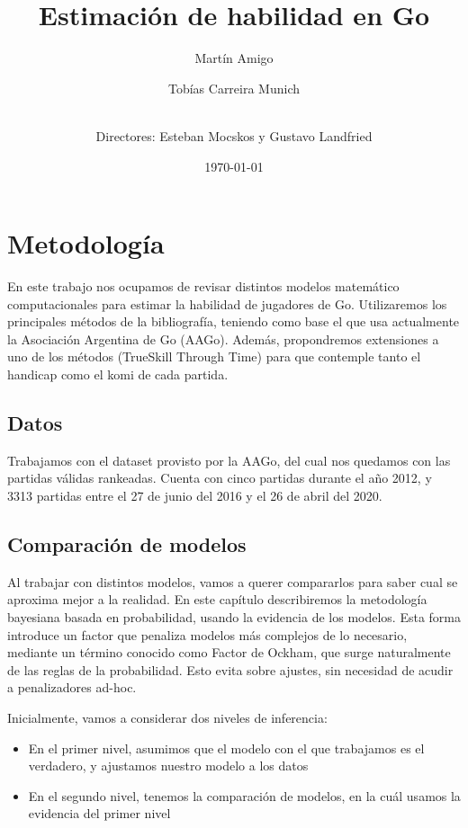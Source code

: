 \documentclass[a4paper,10pt]{report}
\title{Estimaci\'on de habilidad en Go}
\author[a]{Martín Amigo}
\author[a]{Tobías Carreira Munich}
\author[a]{\\ \vspace{0.3cm} \normalsize Directores: Esteban Mocskos y Gustavo Landfried}
\date{\today}
\affil[a]{\small Universidad de Buenos Aires. Facultad de Ciencias Exactas y Naturales. Departamento de Computaci\'on. Buenos Aires, Argentina}
\begin{document}
\maketitle

\section*{Metodología}

En este trabajo nos ocupamos de revisar distintos modelos matemático computacionales para estimar la habilidad de jugadores de Go.
Utilizaremos los principales métodos de la bibliografía, teniendo como base el que usa actualmente la Asociación Argentina de Go (AAGo).
Además, propondremos extensiones a uno de los métodos (TrueSkill Through Time) para que contemple tanto el handicap como el komi de cada partida.

\subsection*{Datos}

Trabajamos con el dataset provisto por la AAGo, del cual nos quedamos con las partidas válidas rankeadas. Cuenta con cinco partidas durante el año 2012, y 3313 partidas entre el 27 de junio del 2016 y el 26 de abril del 2020. 

\subsection*{Comparación de modelos}

Al trabajar con distintos modelos, vamos a querer compararlos para saber cual se aproxima mejor a la realidad.
En este cap\'itulo describiremos la metodolog\'ia bayesiana basada en probabilidad, usando la evidencia de los modelos.
Esta forma introduce un factor que penaliza modelos m\'as complejos de lo necesario, mediante un t\'ermino conocido como Factor de Ockham, que surge naturalmente de las reglas de la probabilidad.
Esto evita sobre ajustes, sin necesidad de acudir a penalizadores ad-hoc.

Inicialmente, vamos a considerar dos niveles de inferencia:

\begin{itemize}
	\item En el primer nivel, asumimos que el modelo con el que trabajamos es el verdadero, y ajustamos nuestro modelo a los datos
	\item En el segundo nivel, tenemos la comparaci\'on de modelos, en la cu\'al usamos la evidencia del primer nivel
\end{itemize}
\end{document}
